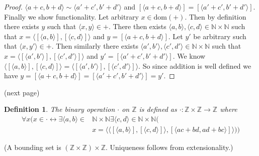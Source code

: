 \documentclass{report}
\newtheorem{definition}[theo]{Definition}
\begin{document}
\begin{proof}
$\langle a+c,b+d\rangle\sim\langle a'+c',b'+d'\rangle$ and 
$[\langle a+c,b+d\rangle]=[\langle a'+c',b'+d'\rangle]$.\\
\indent Finally we show functionality. Let arbitrary $x\in\text{dom}(+)$. Then by definition there exists $y$ such that $\langle x,y\rangle\in+$. There then exists 
$\langle a,b\rangle,\langle c,d\rangle\in\mathbb N\times\mathbb N$ such that 
$x=\langle[\langle a,b\rangle],[\langle c,d\rangle]\rangle$ and $y=[\langle a+c,b+d\rangle]$. Let $y'$ be arbitrary such that 
$\langle x,y'\rangle\in+$. Then similarly there exists $\langle a',b'\rangle,\langle c',d'\rangle\in\mathbb N\times\mathbb N$ such that 
$x=\langle[\langle a',b'\rangle],[\langle c',d'\rangle]\rangle$ and $y'=[\langle a'+c',b'+d'\rangle]$. 
We know $\langle[\langle a,b\rangle],[\langle c,d\rangle]\rangle=\langle[\langle a',b'\rangle],[\langle c',d'\rangle]\rangle$. So since addition is well defined we have
$y=[\langle a+c,b+d\rangle]=[\langle a'+c',b'+d'\rangle]=y'$.
\end{proof}
\noindent(next page)\newpage
\begin{definition}
The binary operation $\cdot$ on $\mathbb Z$ is defined as $\cdot:\mathbb Z\times\mathbb Z\to\mathbb Z$ where
\begin{align*}
\forall x(x\in\cdot\leftrightarrow\exists\langle a,b\rangle\in&\mathbb N\times\mathbb N
\exists\langle c,d\rangle\in\mathbb N\times\mathbb N(\\&x=\langle\langle[\langle a,b\rangle],[\langle c,d\rangle]\rangle,[\langle ac+bd,ad+bc\rangle]\rangle))
\end{align*}
\end{definition}
\noindent(A bounding set is $(\mathbb Z\times\mathbb Z)\times\mathbb Z$. Uniqueness follows from extensionality.)
\end{document}
